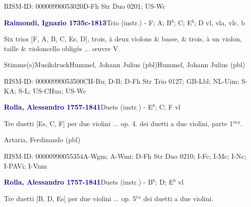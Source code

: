 \documentclass[twocolumn, 12pt]{book}
\begin{document}
\par RISM-ID: 00000990053020\newline D-Fh  Str Duo 0201; US-Wc
\par \vspace{16pt} \textcolor{darkblue}{\textbf{Raimondi, Ignazio  1735c-1813}}\hfillplus{\textbf{[318]}}\newline Trio (instr.) - F; A; B$^b$; C; E$^b$; D vl, vla, vlc, b
\par \begin{itshape}Six trios [F, A, B, C, Es, D], trois, à deux violons \& basse, \& trois, à un violon, taille \& violoncello obligés ... œuvre V.\end{itshape} 
\par \textcolor{darkblue}{}  Stimme(s)\newline Musikdruck\newline Hummel, Johann Julius  (pbl)\newline Hummel, Johann Julius  (pbl)
\par RISM-ID: 00000990053500\newline CH-Bu; D-B; D-Fh  Str Trio 0127; GB-Lbl; NL-Uim; S-KA; S-L; US-CHua; US-Wc
\par \vspace{16pt} \textcolor{darkblue}{\textbf{Rolla, Alessandro  1757-1841}}\hfillplus{\textbf{[319]}}\newline Duets (instr.) - E$^b$; C; F vl
\par \begin{itshape}Tre duetti [Es, C, F] per due violini ... op. 4. dei duetti a due violini, parte 1$^m$$^a$.\end{itshape} \newline Artaria, Ferdinando  (pbl)
\par RISM-ID: 00000990055354\newline A-Wgm; A-Wmi; D-Fh  Str Duo 0210; I-Fc; I-Mc; I-Nc; I-PAVi; I-Vnm
\par \vspace{16pt} \textcolor{darkblue}{\textbf{Rolla, Alessandro  1757-1841}}\hfillplus{\textbf{[320]}}\newline Duets (instr.) - B$^b$; D; E$^b$ vl
\par \begin{itshape}Tre duetti [B, D, Es] per due violini ... op. 5$^t$$^a$ dei duetti a due violini.\end{itshape} 
\end{document}
